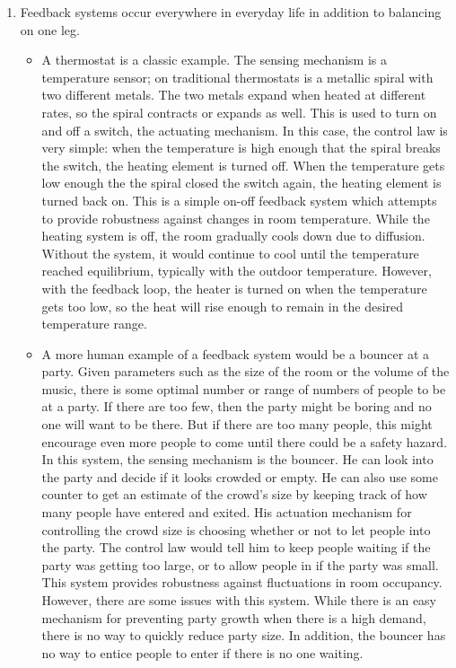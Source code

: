 \documentclass[11pt]{article}
\theoremstyle{definition}
\begin{document}
\begin{enumerate}
    \item %
    Feedback systems occur everywhere in everyday life in addition to balancing on one leg.
    \begin{itemize}
        \item A thermostat is a classic example.  The sensing mechanism is a temperature sensor; on traditional thermostats is a metallic spiral with two different metals.  The two metals expand when heated at different rates, so the spiral contracts or expands as well.  This is used to turn on and off a switch, the actuating mechanism.  In this case, the control law is very simple: when the temperature is high enough that the spiral breaks the switch, the heating element is turned off.  When the temperature gets low enough the the spiral closed the switch again, the heating element is turned back on.  This is a simple on-off feedback system which attempts to provide robustness against changes in room temperature.  While the heating system is off, the room gradually cools down due to diffusion.  Without the system, it would continue to cool until the temperature reached equilibrium, typically with the outdoor temperature.  However, with the feedback loop, the heater is turned on when the temperature gets too low, so the heat will rise enough to remain in the desired temperature range.
        
        \item A more human example of a feedback system would be a bouncer at a party.  Given parameters such as the size of the room or the volume of the music, there is some optimal number or range of numbers of people to be at a party.  If there are too few, then the party might be boring and no one will want to be there.  But if there are too many people, this might encourage even more people to come until there could be a safety hazard.  In this system, the sensing mechanism is the bouncer.  He can look into the party and decide if it looks crowded or empty.  He can also use some counter to get an estimate of the crowd's size by keeping track of how many people have entered and exited.  His actuation mechanism for controlling the crowd size is choosing whether or not to let people into the party.  The control law would tell him to keep people waiting if the party was getting too large, or to allow people in if the party was small.  This system provides robustness against fluctuations in room occupancy.  However, there are some issues with this system.  While there is an easy mechanism for preventing party growth when there is a high demand, there is no way to quickly reduce party size.  In addition, the bouncer has no way to entice people to enter if there is no one waiting.
        

\end{itemize}
\end{enumerate}
\end{document}
